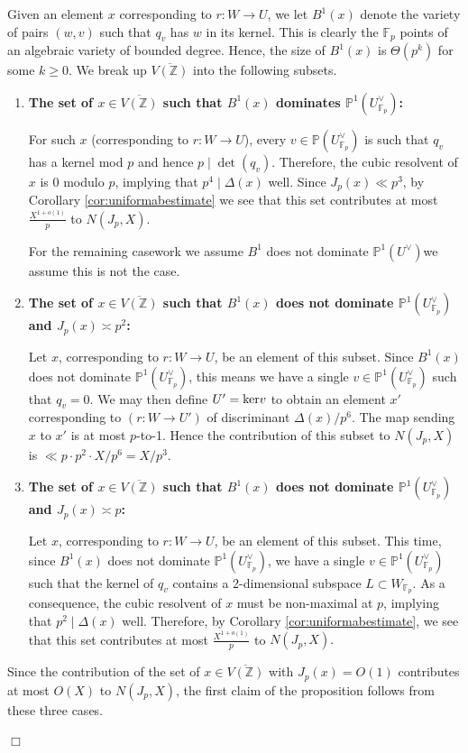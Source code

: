 \documentclass{article}
\def\Z{{\mathbb Z}}
\def\ra{{\rightarrow}}
\def\P{{\mathbb P}}
\def\ker{{\rm ker}}
\def\F{{\mathbb F}}
\def\Z{{\mathbb Z}}
\def\P{{\mathbb P}}
\def\F{{\mathbb F}}
\def\ol{\overline}
\newenvironment{proof}{\noindent {\bf Proof:}}{$\Box$ \vspace{2 ex}}
\begin{document}
\begin{proof}
Given an element $x$ corresponding to $r:W\to U$, we let  $B^1(x)$ denote the variety of pairs $(w,v)$ such that $q_v$ has $w$ in its kernel. This is clearly the $\F_p$ points of an algebraic variety of bounded degree. Hence, the size of $B^1(x)$ is $\Theta(p^k)$ for some $k\geq 0$. We break up $\ol{V(\Z)}$ into the following subsets.

\begin{enumerate}
    \item \textbf{The set of $x\in \ol{V(\Z)}$ such that $B^1(x)$ dominates $\P^1(U^{\vee}_{\F_p})$:}
    
    For such $x$ (corresponding to $r:W\to U$), every $v\in \P(U_{\F_p}^\vee)$ is such that $q_v$ has a kernel mod $p$ and hence $p\mid\det(q_v)$. Therefore, the cubic resolvent of $x$ is $0$ modulo $p$, implying that $p^4\mid\Delta(x)$ well. Since $J_p(x)\ll p^3$, by Corollary \ref{cor:uniformabestimate} we see that this set contributes at most $\frac{X^{1+o(1)}}{p}$ to $N(J_p,X)$. 
    
    For the remaining casework we assume $B^1$ does not dominate $\P^1(U^{\vee})$we assume this is not the case.

    \item \textbf{The set of $x\in \ol{V(\Z)}$ such that $B^1(x)$ does not dominate $\P^1(U^{\vee}_{\F_p})$ and $J_p(x)\asymp p^2$:}
    
    Let $x$, corresponding to $r:W\to U$, be an element of this subset. Since $B^1(x)$ does not dominate $\P^1(U^{\vee}_{\F_p})$, this means we have a single $v\in \P^1(U^{\vee}_{\F_p})$ such that $q_v=0$. We may then define $U'=\ker v$ to obtain an element $x'$ corresponding to $(r:W\ra U')$ of discriminant $\Delta(x)/p^6$. The map sending $x$ to $x'$ is at most $p$-to-1. Hence the contribution of this subset to $N(J_p,X)$ is $\ll p \cdot p^2\cdot X/p^6=X/p^3$. 
    
    \item \textbf{The set of $x\in \ol{V(\Z)}$ such that $B^1(x)$ does not dominate $\P^1(U^{\vee}_{\F_p})$ and $J_p(x)\asymp p$:}

    Let $x$, corresponding to $r:W\to U$, be an element of this subset. This time, since $B^1(x)$ does not dominate $\P^1(U^{\vee}_{\F_p})$, we have a single $v\in \P^1(U^{\vee}_{\F_p})$ such that the kernel of $q_v$ contains a 2-dimensional subspace $L\subset W_{\F_p}$. As a consequence, the cubic resolvent of $x$ must be non-maximal at $p$, implying that $p^2\mid\Delta(x)$ well. Therefore, by Corollary \ref{cor:uniformabestimate}, we see that this set contributes at most  $\frac{X^{1+o(1)}}{p}$ to $N(J_p,X).$ 
\end{enumerate}
Since the contribution of the set of $x\in\ol{V(\Z)}$ with $J_p(x)=O(1)$ contributes at most $O(X)$ to $N(J_p,X)$, the first claim of the proposition follows from these three cases.


\end{proof}
\end{document}
